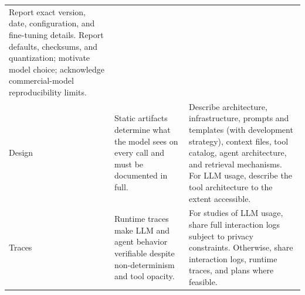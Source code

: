 \documentclass[smallextended]{svjour3}
\newcommand{\must}{\textbf{must}\xspace}
\newcommand{\should}{\textbf{should}\xspace}
\newcommand{\iconM}{\usebox{\iconMbox}\xspace}
\newcommand{\iconS}{\usebox{\iconSbox}\xspace}
\newcommand{\iconM}{●\xspace}
\newcommand{\iconS}{○\xspace}
\newcommand{\llmusage}{\hyperref[sec:studying-llm-usage-in-software-engineering]{\emph{Studying LLM Usage}}\xspace}
\newcommand{\llmusage}{\href{/study-types\#studying-llm-usage-in-software-engineering}{\emph{Studying LLM Usage}}\xspace}
\begin{document}
\begin{appendices}
\begin{center}
\begin{tabularx}{\textwidth}{@{}l>{\raggedright\arraybackslash}X>{\raggedright\arraybackslash}X@{}}
\iconM Report exact version, date, configuration, and fine-tuning details.
\newline \iconS Report defaults, checksums, and quantization; motivate model choice; acknowledge commercial-model reproducibility limits. \\
\addlinespace
Design & Static artifacts determine what the model sees on every call and must be documented in full. &
\iconM Describe architecture, infrastructure, prompts and templates (with development strategy), context files, tool catalog, agent architecture, and retrieval mechanisms.
\newline \iconS For LLM usage, describe the tool architecture to the extent accessible. \\
\addlinespace
Traces & Runtime traces make LLM and agent behavior verifiable despite non-determinism and tool opacity. &
\iconM For studies of LLM usage, share full interaction logs subject to privacy constraints.
\newline \iconS Otherwise, share interaction logs, runtime traces, and plans where feasible. \\

\end{tabularx}
\end{center}
\end{appendices}
\end{document}
